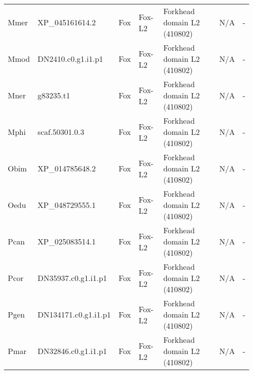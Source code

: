 \documentclass[../main.tex]{subfiles}
\begin{document}
\begin{landscape}
\begin{longtable}{lllllll}
		Mmer           & XP\_045161614.2       & Fox            & Fox-L2              & Forkhead domain L2 (410802)                 & N/A                                                                    & -                    \\
		Mmod           & DN2410.c0.g1.i1.p1    & Fox            & Fox-L2              & Forkhead domain L2 (410802)                 & N/A                                                                    & -                    \\
		Mner           & g83235.t1             & Fox            & Fox-L2              & Forkhead domain L2 (410802)                 & N/A                                                                    & -                    \\
		Mphi           & scaf.50301.0.3        & Fox            & Fox-L2              & Forkhead domain L2 (410802)                 & N/A                                                                    & -                    \\
		Obim           & XP\_014785648.2       & Fox            & Fox-L2              & Forkhead domain L2 (410802)                 & N/A                                                                    & -                    \\
		Oedu           & XP\_048729555.1       & Fox            & Fox-L2              & Forkhead domain L2 (410802)                 & N/A                                                                    & -                    \\
		Pcan           & XP\_025083514.1       & Fox            & Fox-L2              & Forkhead domain L2 (410802)                 & N/A                                                                    & -                    \\
		Pcor           & DN35937.c0.g1.i1.p1   & Fox            & Fox-L2              & Forkhead domain L2 (410802)                 & N/A                                                                    & -                    \\
		Pgen           & DN134171.c0.g1.i1.p1  & Fox            & Fox-L2              & Forkhead domain L2 (410802)                 & N/A                                                                    & -                    \\
		Pmar           & DN32846.c0.g1.i1.p1   & Fox            & Fox-L2              & Forkhead domain L2 (410802)                 & N/A                                                                    & -                    \\

\end{longtable}
\end{landscape}
\end{document}
